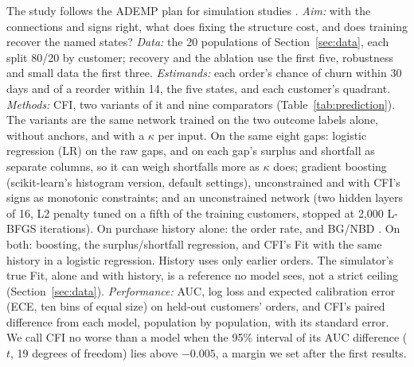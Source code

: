 \documentclass[10pt,twocolumn,letterpaper]{article}
\newcommand{\secref}[1]{Section~\mbox{\ref{#1}}}
\begin{document}
The study follows the ADEMP plan for simulation studies \cite{morris2019}. \textit{Aim:} with the connections and signs right, what does fixing the structure cost, and does training recover the named states? \textit{Data:} the 20 populations of \secref{sec:data}, each split 80/20 by customer; recovery and the ablation use the first five, robustness and small data the first three. \textit{Estimands:} each order's chance of churn within 30 days and of a reorder within 14, the five states, and each customer's quadrant. \textit{Methods:} CFI, two variants of it and nine comparators (Table~\ref{tab:prediction}). The variants are the same network trained on the two outcome labels alone, without anchors, and with a $\kappa$ per input. On the same eight gaps: logistic regression (LR) on the raw gaps, and on each gap's surplus and shortfall as separate columns, so it can weigh shortfalls more as $\kappa$ does; gradient boosting \cite{friedman2001} (scikit-learn's histogram version, default settings), unconstrained and with CFI's signs as monotonic constraints; and an unconstrained network (two hidden layers of 16, L2 penalty tuned on a fifth of the training customers, stopped at 2,000 L-BFGS iterations). On purchase history alone: the order rate, and BG/NBD \cite{fader2005}. On both: boosting, the surplus/shortfall regression, and CFI's Fit with the same history in a logistic regression. History uses only earlier orders. The simulator's true Fit, alone and with history, is a reference no model sees, not a strict ceiling (\secref{sec:data}). \textit{Performance:} AUC, log loss and expected calibration error (ECE, ten bins of equal size) on held-out customers' orders, and CFI's paired difference from each model, population by population, with its standard error. We call CFI no worse than a model when the 95\% interval of its AUC difference ($t$, 19 degrees of freedom) lies above $-0.005$, a margin we set after the first results.
\end{document}
